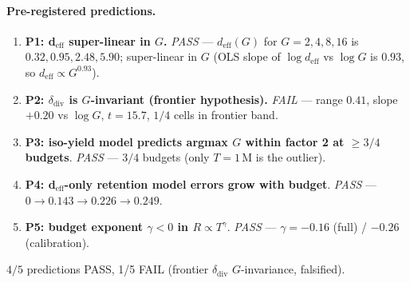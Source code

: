 \paragraph{Pre-registered predictions.}
\begin{enumerate}
  \item\textbf{P1: d$_{\mathrm{eff}}$ super-linear in $G$.}
        \emph{PASS} --- $d_{\mathrm{eff}}(G)$ for $G{=}2, 4, 8, 16$
        is $0.32, 0.95, 2.48, 5.90$; super-linear in $G$
        (OLS slope of $\log d_{\mathrm{eff}}$ vs $\log G$ is
        $0.93$, so $d_{\mathrm{eff}} \propto G^{0.93}$).
  \item \textbf{P2: $\delta_{\mathrm{div}}$ is $G$-invariant (frontier hypothesis).}
        \emph{FAIL} --- range $0.41$, slope $+0.20$ vs $\log G$,
        $t = 15.7$, $1/4$ cells in frontier band.
  \item \textbf{P3: iso-yield model predicts argmax $G$ within
        factor 2 at $\ge 3/4$ budgets}. \emph{PASS} --- $3/4$ budgets
        (only $T{=}1$\,M is the outlier).
  \item \textbf{P4: d$_{\mathrm{eff}}$-only retention model errors
        grow with budget}. \emph{PASS} --- $0 \to 0.143 \to 0.226
        \to 0.249$.
  \item \textbf{P5: budget exponent $\gamma < 0$ in $R \propto T^\gamma$}.
        \emph{PASS} --- $\gamma = -0.16$ (full) / $-0.26$ (calibration).
\end{enumerate}
$4/5$ predictions PASS, 1/5 FAIL (frontier $\delta_{\mathrm{div}}$
$G$-invariance, falsified).

